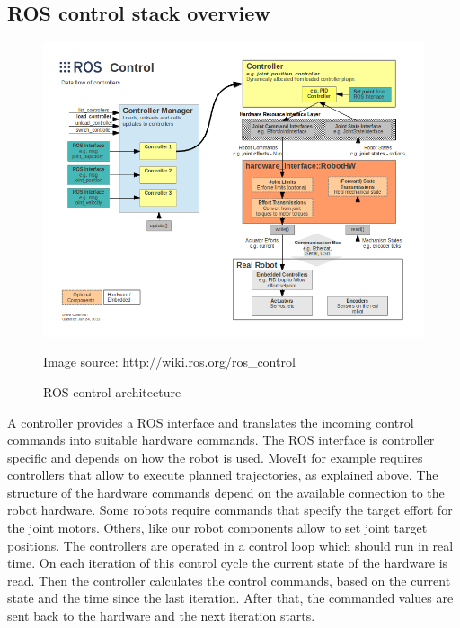 \subsection{ROS control stack overview}

\begin{figure}[h]
	\centering
  	\includegraphics[width=1.0\textwidth]{images/ros_control.png}
	\caption{ROS control architecture}
	{\scriptsize Image source: http://wiki.ros.org/ros\_control}
	\label{fig:ros_control}
\end{figure}

A controller provides a ROS interface and translates the incoming control commands into suitable hardware commands. The ROS interface is controller specific and depends on how the robot is used. MoveIt for example requires controllers that allow to execute planned trajectories, as explained above. The structure of the hardware commands depend on the available connection to the robot hardware. Some robots require commands that specify the target effort for the joint motors. Others, like our robot components allow to set joint target positions. The controllers are operated in a control loop which should run in real time. On each iteration of this control cycle the current state of the hardware is read. Then the controller calculates the control commands, based on the current state and the time since the last iteration. After that, the commanded values are sent back to the hardware and the next iteration starts. \\

